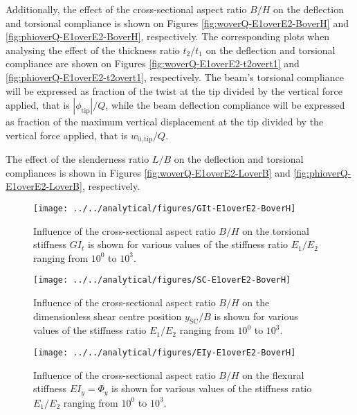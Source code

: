 Additionally, the effect of the cross-sectional aspect ratio $B/H$ on the deflection and torsional compliance is shown on Figures \ref{fig:woverQ-E1overE2-BoverH} and \ref{fig:phioverQ-E1overE2-BoverH}, respectively. The corresponding plots when analysing the effect of the thickness ratio $t_2/t_1$ on the deflection and torsional compliance are shown on Figures \ref{fig:woverQ-E1overE2-t2overt1} and \ref{fig:phioverQ-E1overE2-t2overt1}, respectively. The beam's torsional compliance will be expressed as fraction of the twist at the tip divided by the vertical force applied, that is $|\phi_{\mathrm{tip}}| / Q$, while the beam deflection compliance will be expressed as fraction of the maximum vertical displacement at the tip divided by the vertical force applied, that is $w_{\mathrm{0,tip}} / Q$.

The effect of the slenderness ratio $L/B$ on the deflection and torsional compliances is shown in Figures \ref{fig:woverQ-E1overE2-LoverB} and \ref{fig:phioverQ-E1overE2-LoverB}, respectively.

\begin{figure}[!htpb] %
  \centering
  \texttt{[image: ../../analytical/figures/GIt-E1overE2-BoverH]}
  \caption[Influence of the cross-sectional aspect ratio $B/H$ on the torsional stiffness $GI_t$]{Influence of the cross-sectional aspect ratio $B/H$ on the torsional stiffness $GI_t$ is shown for various values of the stiffness ratio $E_1/E_2$ ranging from $10^0$ to $10^3$. }\label{fig:GIt-E1overE2-BoverH}
\end{figure}

\begin{figure}[!htpb] %
  \centering
  \texttt{[image: ../../analytical/figures/SC-E1overE2-BoverH]}
  \caption[Influence of the cross-sectional aspect ratio $B/H$ on the dimensionless shear centre position $y_{\mathrm{SC}}/B$]{Influence of the cross-sectional aspect ratio $B/H$ on the dimensionless shear centre position $y_{\mathrm{SC}}/B$ is shown for various values of the stiffness ratio $E_1/E_2$ ranging from $10^0$ to $10^3$. }\label{fig:SC-E1overE2-BoverH}
\end{figure}

\begin{figure}[!htpb] %
  \centering
  \texttt{[image: ../../analytical/figures/EIy-E1overE2-BoverH]}
  \caption[Influence of the cross-sectional aspect ratio $B/H$ on the flexural stiffness $EI_y$]{Influence of the cross-sectional aspect ratio $B/H$ on the flexural stiffness $EI_y = \Phi_y$ is shown for various values of the stiffness ratio $E_1/E_2$ ranging from $10^0$ to $10^3$. }\label{fig:EIy-E1overE2-BoverH}
\end{figure}

